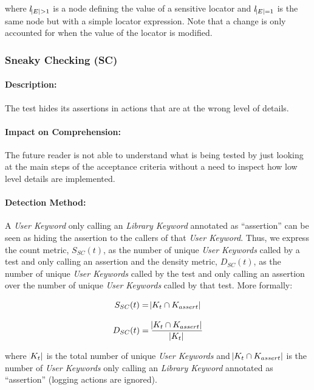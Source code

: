 where $l_{\abs{E} > 1}$ is a node defining the value of a sensitive locator and $l_{\abs{E} = 1}$ is the same node but with a simple locator expression. Note that a change is only accounted for when the value of the locator is modified.

\subsubsection{Sneaky Checking (SC)}

\paragraph{Description:}

The test hides its assertions in actions that are at the wrong level of details.

\paragraph{Impact on Comprehension:} The future reader is not able to understand what is being tested by just looking at the main steps of the acceptance criteria without a need to inspect how low level details are implemented.

\paragraph{Detection Method:}

A \emph{User Keyword} only calling an \emph{Library Keyword} annotated as ``assertion'' can be seen as hiding the assertion to the callers of that \emph{User Keyword}. Thus, we express the count metric, $S_{SC}(t)$, as the number of unique \emph{User Keywords} called by a test and only calling an assertion and the density metric, $D_{SC}(t)$, as the number of unique \emph{User Keywords} called by the test and only calling an assertion over the number of unique \emph{User Keywords} called by that test. More formally:

\begin{equation*}
    S_{SC}(t) = \abs{K_{t} \cap K_{assert}}
\end{equation*}

\begin{equation*}
    D_{SC}(t) = \frac{\abs{K_{t} \cap K_{assert}}}{\abs{K_{t}}}
\end{equation*}

where $\abs{K_{t}}$ is the total number of unique \emph{User Keywords} and $\abs{K_{t} \cap K_{assert}}$ is the number of \emph{User Keywords} only calling an \emph{Library Keyword} annotated as ``assertion'' (logging actions are ignored).

